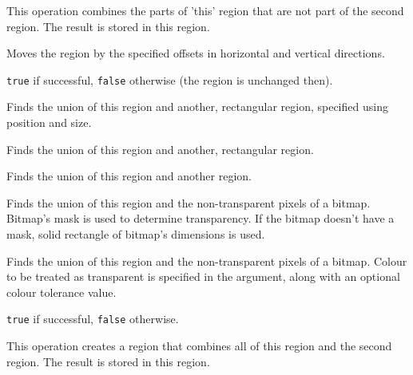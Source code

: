 This operation combines the parts of 'this' region that are not part of the second region.
The result is stored in this region.

\label{wxregionoffset}


Moves the region by the specified offsets in horizontal and vertical
directions.


{\tt true} if successful, {\tt false} otherwise (the region is unchanged then).

\label{wxregionunion}


Finds the union of this region and another, rectangular region, specified using position and size.


Finds the union of this region and another, rectangular region.


Finds the union of this region and another region.


Finds the union of this region and the non-transparent pixels of a
bitmap. Bitmap's mask is used to determine transparency. If the bitmap doesn't
have a mask, solid rectangle of bitmap's dimensions is used.


Finds the union of this region and the non-transparent pixels of a
bitmap. Colour to be treated as transparent is specified in the
 argument, along with an
optional colour tolerance value.


{\tt true} if successful, {\tt false} otherwise.


This operation creates a region that combines all of this region and the second region.
The result is stored in this region.


